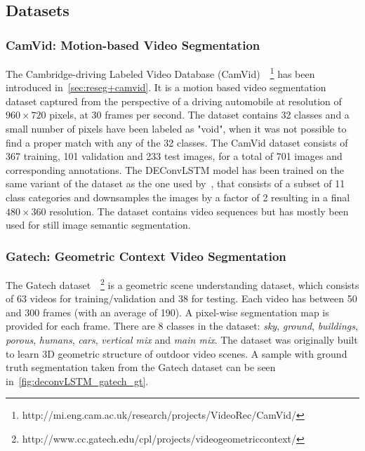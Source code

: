 \subsection{Datasets}\label{sec:deconvLSTM_datasets}

\subsubsection{CamVid: Motion-based Video Segmentation}
\label{sec:deconvLSTM_camvid}
The Cambridge-driving Labeled Video Database (CamVid)~\cite{
Brostow2010semantic}~\footnote{%
http://mi.eng.cam.ac.uk/research/projects/VideoRec/CamVid/}
has been introduced in~\autoref{sec:reseg+camvid}. It is a motion based video
segmentation dataset captured from the perspective of a driving automobile at
resolution of $960 \times 720$ pixels, at 30 frames per second. The dataset
contains 32 classes and a small number of pixels have been labeled as "void",
when it was not possible to find a proper match with any of the 32 classes. The
CamVid dataset consists of 367 training, 101 validation and 233 test images,
for a total of 701 images and corresponding annotations. The DEConvLSTM model
has been trained on the same variant of the dataset as the one used
by~\cite{badrinarayanan2015segnet}, that consists of a subset of 11 class
categories and downsamples the images by a factor of 2 resulting in a final
$480 \times 360$ resolution. The dataset contains video sequences but has
mostly been used for still image semantic segmentation.


\subsubsection{Gatech: Geometric Context Video Segmentation}
\label{sec:deconvLSTM_gatech}
The Gatech dataset~\cite{VideoGeometricContext2013}~\footnote{%
http://www.cc.gatech.edu/cpl/projects/videogeometriccontext/}
is a geometric scene understanding dataset, which consists of 63 videos for
training/validation and 38 for testing. Each video has between 50 and 300
frames (with an average of 190). A pixel-wise segmentation map is provided for
each frame. There are 8 classes in the dataset: \textit{sky}, \textit{ground},
\textit{buildings}, \textit{porous}, \textit{humans}, \textit{cars},
\textit{vertical mix} and \textit{main mix}. The dataset was originally built
to learn 3D geometric structure of outdoor video scenes. A sample with ground
truth segmentation taken from the Gatech dataset can be seen
in~\autoref{fig:deconvLSTM_gatech_gt}.

